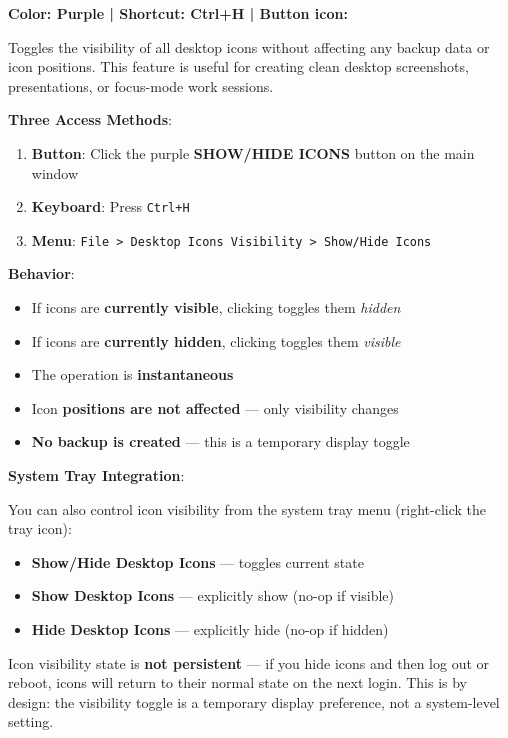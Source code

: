 \documentclass[a4paper,11pt]{article}
\begin{document}
\textcolor[HTML]{9C27B0}{\textbf{Color: Purple | Shortcut: Ctrl+H | Button
icon: \faEye}}

Toggles the visibility of all desktop icons without affecting any backup
data or icon positions. This feature is useful for creating clean desktop
screenshots, presentations, or focus-mode work sessions.

\textbf{Three Access Methods}:
\begin{enumerate}
  \item \textbf{Button}: Click the purple \textbf{SHOW/HIDE ICONS}
    button on the main window
  \item \textbf{Keyboard}: Press \texttt{Ctrl+H}
  \item \textbf{Menu}: \texttt{File > Desktop Icons Visibility >
    Show/Hide Icons}
\end{enumerate}

\textbf{Behavior}:
\begin{itemize}
  \item If icons are \textbf{currently visible}, clicking toggles them
    \textit{hidden}
  \item If icons are \textbf{currently hidden}, clicking toggles them
    \textit{visible}
  \item The operation is \textbf{instantaneous}
  \item Icon \textbf{positions are not affected} --- only visibility
    changes
  \item \textbf{No backup is created} --- this is a temporary display toggle
\end{itemize}

\textbf{System Tray Integration}:

You can also control icon visibility from the system tray menu (right-click
the tray icon):
\begin{itemize}
  \item \textbf{Show/Hide Desktop Icons} --- toggles current state
  \item \textbf{Show Desktop Icons} --- explicitly show (no-op if visible)
  \item \textbf{Hide Desktop Icons} --- explicitly hide (no-op if hidden)
\end{itemize}

\begin{warningbox}
  Icon visibility state is \textbf{not persistent} --- if you hide icons
  and then log out or reboot, icons will return to their normal state on
  the next login. This is by design: the visibility toggle is a temporary
  display preference, not a system-level setting.
\end{warningbox}
\end{document}
